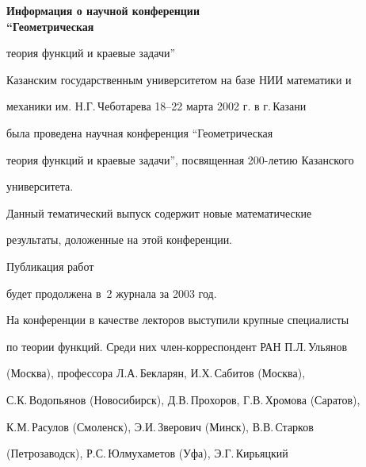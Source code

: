 


\setcounter{page}{85} 

\pagestyle{plain}





\begin{center}

{\Large \bf Информация о научной конференции\\ ``Геометрическая 

теория функций и краевые задачи''}

\end{center}

\vskip 1cm



Казанским государственным университетом на базе НИИ математики и

механики им. Н.Г.\,Че\-ботарева 18--22 марта 2002 г. в г.\,Казани

была проведена научная конференция ``Геометрическая 

теория функций и краевые задачи'', посвященная 200-летию Казанского

университета. 



Данный тематический выпуск содержит новые математические 

результаты, доложенные на этой конференции.

Публикация работ

будет продолжена в \No\,2 журнала за 2003 год.



На конференции в качестве лекторов выступили крупные специалисты 

по теории функций. Среди них член-корреспондент РАН П.Л.\,Ульянов

(Москва), профессора Л.А.\,Бекларян, И.Х.\,Сабитов (Москва), 

С.К.\,Водопьянов (Новосибирск), Д.В.\,Прохоров, Г.В.\,Хромова (Саратов), 

К.М.\,Расулов (Смоленск), Э.И.\,Зверович (Минск), В.В.\,Старков

(Петрозаводск), Р.С.\,Юл\-му\-ха\-ме\-тов (Уфа), Э.Г.\,Кирьяцкий 

